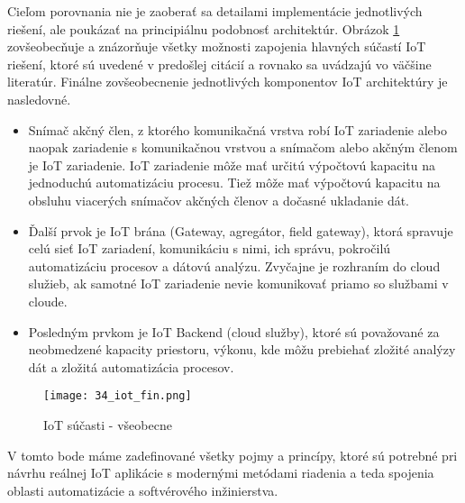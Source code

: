 Cieľom porovnania nie je zaoberať sa detailami implementácie jednotlivých riešení, ale poukázať na principiálnu podobnosť architektúr. Obrázok \ref{34_iot_fin} zovšeobecňuje a znázorňuje všetky možnosti zapojenia hlavných súčastí IoT riešení, ktoré sú uvedené v predošlej citácií a rovnako sa uvádzajú vo väčšine literatúr. Finálne zovšeobecnenie jednotlivých komponentov IoT architektúry je nasledovné. 
\begin{itemize}
\item Snímač akčný člen, z ktorého komunikačná vrstva robí IoT zariadenie alebo naopak zariadenie s komunikačnou vrstvou a snímačom alebo akčným členom je IoT zariadenie. IoT zariadenie môže mať určitú výpočtovú kapacitu na jednoduchú automatizáciu procesu. Tiež môže mať výpočtovú kapacitu na obsluhu viacerých snímačov akčných členov a dočasné ukladanie dát. 
\item Ďalší prvok je IoT brána (Gateway, agregátor, field gateway), ktorá spravuje celú sieť IoT zariadení, komunikáciu s nimi, ich správu, pokročilú automatizáciu procesov a dátovú analýzu. Zvyčajne je rozhraním do cloud služieb, ak samotné IoT zariadenie nevie komunikovať priamo so službami v cloude. 
\item Posledným prvkom je IoT Backend (cloud služby), ktoré sú považované za neobmedzené kapacity priestoru, výkonu, kde môžu prebiehať zložité analýzy dát a zložitá automatizácia procesov.
\end{itemize}
\begin{figure}[!htbp]
\centering
\texttt{[image: 34\_iot\_fin.png]}
\caption{IoT súčasti - všeobecne\cite{IOT23}}
\label{34_iot_fin}
\end{figure} 

V tomto bode máme zadefinované všetky pojmy a princípy, ktoré sú potrebné pri návrhu reálnej IoT aplikácie s modernými metódami riadenia a teda spojenia oblasti automatizácie a softvérového inžinierstva. 


